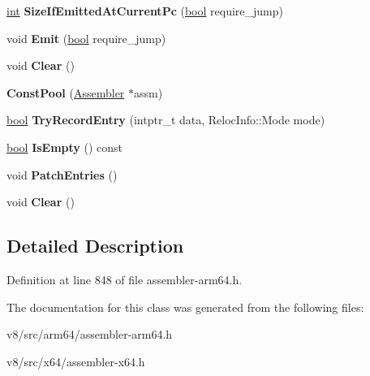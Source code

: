 \begin{DoxyCompactItemize}
\item 
\mbox{\label{classv8_1_1internal_1_1ConstPool_a7564d0079adb1c574dc1f505cf56e97a}} 
\mbox{\hyperlink{classint}{int}} {\bfseries Size\+If\+Emitted\+At\+Current\+Pc} (\mbox{\hyperlink{classbool}{bool}} require\+\_\+jump)
\item 
\mbox{\label{classv8_1_1internal_1_1ConstPool_aa6ea87074c1835b249d592f1c696a219}} 
void {\bfseries Emit} (\mbox{\hyperlink{classbool}{bool}} require\+\_\+jump)
\item 
\mbox{\label{classv8_1_1internal_1_1ConstPool_ad00c13ed8f086484fa21e453c39cc05c}} 
void {\bfseries Clear} ()
\item 
\mbox{\label{classv8_1_1internal_1_1ConstPool_a10cd51c71aa865ccd6dec22f830bcfe5}} 
{\bfseries Const\+Pool} (\mbox{\hyperlink{classv8_1_1internal_1_1Assembler}{Assembler}} $\ast$assm)
\item 
\mbox{\label{classv8_1_1internal_1_1ConstPool_ae79636ee350a5a50181067043a0f4479}} 
\mbox{\hyperlink{classbool}{bool}} {\bfseries Try\+Record\+Entry} (intptr\+\_\+t data, Reloc\+Info\+::\+Mode mode)
\item 
\mbox{\label{classv8_1_1internal_1_1ConstPool_af083d890988d2b259c5576c43caa5e20}} 
\mbox{\hyperlink{classbool}{bool}} {\bfseries Is\+Empty} () const
\item 
\mbox{\label{classv8_1_1internal_1_1ConstPool_ab2bab8aa08530c1421d1b18ea70d5121}} 
void {\bfseries Patch\+Entries} ()
\item 
\mbox{\label{classv8_1_1internal_1_1ConstPool_ad00c13ed8f086484fa21e453c39cc05c}} 
void {\bfseries Clear} ()
\end{DoxyCompactItemize}


\subsection{Detailed Description}


Definition at line 848 of file assembler-\/arm64.\+h.



The documentation for this class was generated from the following files\+:\begin{DoxyCompactItemize}
\item 
v8/src/arm64/assembler-\/arm64.\+h\item 
v8/src/x64/assembler-\/x64.\+h\end{DoxyCompactItemize}
